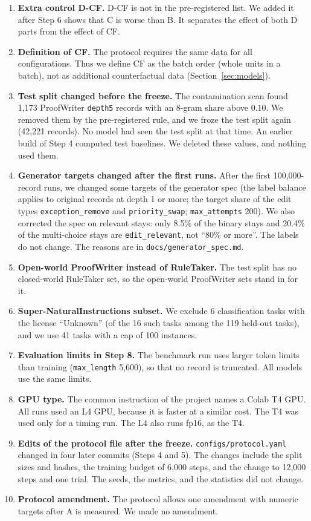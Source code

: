 \documentclass[11pt,a4paper]{article}
\begin{document}
\begin{enumerate}
  \item \textbf{Extra control D-CF.} D-CF is not in the pre-registered list. We added it after Step 6 shows that C is worse than B. It separates the effect of both D parts from the effect of CF.
  \item \textbf{Definition of CF.} The protocol requires the same data for all configurations. Thus we define CF as the batch order (whole units in a batch), not as additional counterfactual data (Section~\ref{sec:models}).
  \item \textbf{Test split changed before the freeze.} The contamination scan found 1{,}173 ProofWriter \texttt{depth5} records with an 8-gram share above $0.10$. We removed them by the pre-registered rule, and we froze the test split again (42{,}221 records). No model had seen the test split at that time. An earlier build of Step 4 computed test baselines. We deleted these values, and nothing used them.
  \item \textbf{Generator targets changed after the first runs.} After the first 100{,}000-record runs, we changed some targets of the generator spec (the label balance applies to original records at depth 1 or more; the target share of the edit types \texttt{exception\_remove} and \texttt{priority\_swap}; \texttt{max\_attempts} 200). We also corrected the spec on relevant stays: only 8.5\% of the binary stays and 20.4\% of the multi-choice stays are \texttt{edit\_relevant}, not ``80\% or more''. The labels do not change. The reasons are in \texttt{docs/generator\_spec.md}.
  \item \textbf{Open-world ProofWriter instead of RuleTaker.} The test split has no closed-world RuleTaker set, so the open-world ProofWriter sets stand in for it.
  \item \textbf{Super-NaturalInstructions subset.} We exclude 6 classification tasks with the license ``Unknown'' (of the 16 such tasks among the 119 held-out tasks), and we use 41 tasks with a cap of 100 instances.
  \item \textbf{Evaluation limits in Step 8.} The benchmark run uses larger token limits than training (\texttt{max\_length} 5{,}600), so that no record is truncated. All models use the same limits.
  \item \textbf{GPU type.} The common instruction of the project names a Colab T4 GPU. All runs used an L4 GPU, because it is faster at a similar cost. The T4 was used only for a timing run. The L4 also runs fp16, as the T4.
  \item \textbf{Edits of the protocol file after the freeze.} \texttt{configs/protocol.yaml} changed in four later commits (Steps 4 and 5). The changes include the split sizes and hashes, the training budget of 6{,}000 steps, and the change to 12{,}000 steps and one trial. The seeds, the metrics, and the statistics did not change.
  \item \textbf{Protocol amendment.} The protocol allows one amendment with numeric targets after A is measured. We made no amendment.
\end{enumerate}
\end{document}

